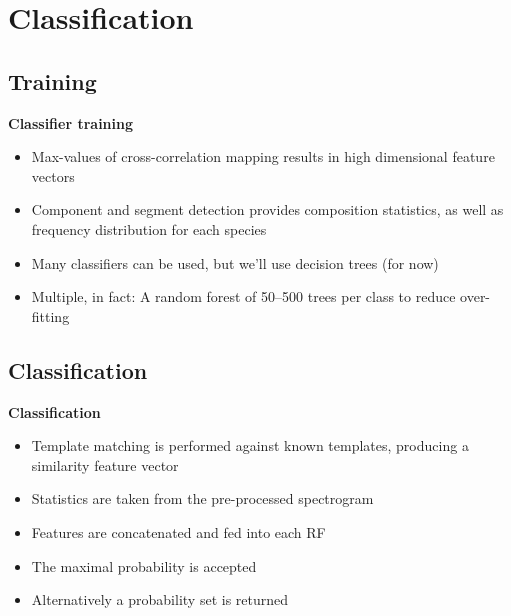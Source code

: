 \documentclass[t, xcolor={dvipsnames}]{beamer}
\begin{document}

\section{Classification}
\subsection{Training}
\begin{frame}[fragile]
  \vspace{0.5cm}
  {\bfseries\Large Classifier training}\\
  \vspace{0.5cm}
  \begin{addmargin}{0.5cm}
    \begin{itemize}
      \item Max-values of cross-correlation mapping results in high dimensional feature vectors
      \item Component and segment detection provides composition statistics, as well as frequency distribution for each species
      \item Many classifiers can be used, but we'll use decision trees (for now)
      \item Multiple, in fact: A random forest of 50--500 trees per class to reduce over-fitting
    \end{itemize}
  \end{addmargin}
\end{frame}

\subsection{Classification}
\begin{frame}[fragile]
  \vspace{0.5cm}
  {\bfseries\Large Classification}
  \vspace{0.5cm}
  \begin{addmargin}{0.5cm}
    \begin{itemize}
      \item Template matching is performed against known templates, producing a similarity feature vector
      \item Statistics are taken from the pre-processed spectrogram
      \item Features are concatenated and fed into each RF
      \item The maximal probability is accepted
      \item Alternatively a probability set is returned
    \end{itemize}
  \end{addmargin}
\end{frame}
\end{document}
